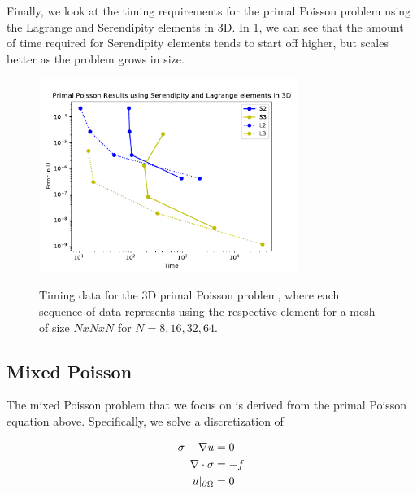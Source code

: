 \documentclass[manuscript,screen]{acmart}
\begin{document}
\noindent Finally, we look at the timing requirements for the primal Poisson problem using the Lagrange and Serendipity elements in 3D.  In \ref{fig:3dPrimalTime}, we can see that the amount of time required for Serendipity elements tends to start off higher, but scales better as the problem grows in size.  

  \begin{figure}[h!]
    \caption{Timing data for the 3D primal Poisson problem, where each sequence of data represents using the respective element for a mesh of size $N x N x N$ for $N = 8, 16, 32, 64$.}
    \includegraphics[width=0.75\textwidth]{3dPrimalTime.pdf}
    \label{fig:3dPrimalTime}
  \end{figure}


\newpage
\subsection{Mixed Poisson}

  
The mixed Poisson problem that we focus on is derived from the primal Poisson equation above.  Specifically, we solve a discretization of 

\begin{align}
     \sigma - \nabla u &= 0 \\
     \nabla \cdot \sigma &= -f \notag \\
     u\vert_{\partial \Omega} &= 0 \notag
\end{align}

 
\end{document}
